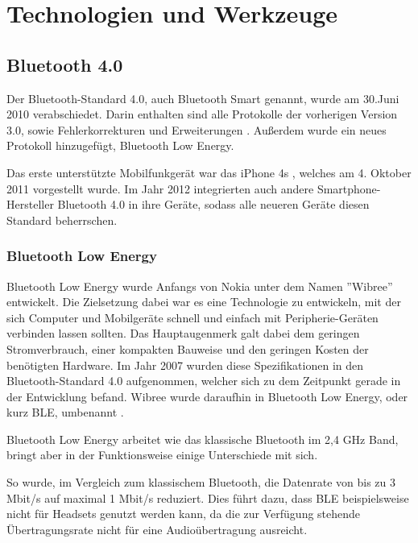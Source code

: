 \chapter{Technologien und Werkzeuge}
\label{chap:technologies}

\section{Bluetooth 4.0}
\label{sec:technologies:bluetooth4}

Der Bluetooth-Standard 4.0, auch Bluetooth Smart genannt, wurde am 30.Juni 2010 verabschiedet. Darin enthalten sind alle Protokolle der vorherigen Version 3.0, sowie Fehlerkorrekturen und Erweiterungen \cite{bluetoothcore}. Außerdem wurde ein neues Protokoll hinzugefügt, Bluetooth Low Energy. 

Das erste unterstützte Mobilfunkgerät war das iPhone 4s \cite{iphone4sspecs}, welches am 4. Oktober 2011 vorgestellt wurde. Im Jahr 2012 integrierten auch andere Smartphone-Hersteller Bluetooth 4.0 in ihre Geräte, sodass alle neueren Geräte diesen Standard beherrschen.


\subsection{Bluetooth Low Energy}
\label{sec:technologies:bluetoothLE}

Bluetooth Low Energy wurde Anfangs von Nokia unter dem Namen ''Wibree'' entwickelt. Die Zielsetzung dabei war es eine Technologie zu entwickeln, mit der sich Computer und Mobilgeräte schnell und einfach mit Peripherie-Geräten verbinden lassen sollten. Das Hauptaugenmerk galt dabei dem geringen Stromverbrauch, einer kompakten Bauweise und den geringen Kosten der benötigten Hardware.
Im Jahr 2007 wurden diese Spezifikationen in den Bluetooth-Standard 4.0 aufgenommen, welcher sich zu dem Zeitpunkt gerade in der Entwicklung befand. Wibree wurde daraufhin in Bluetooth Low Energy, oder kurz BLE, umbenannt \cite{wibree}.

Bluetooth Low Energy arbeitet wie das klassische Bluetooth im 2,4 GHz Band, bringt aber in der Funktionsweise einige Unterschiede mit sich.

So wurde, im Vergleich zum klassischem Bluetooth, die Datenrate von bis zu 3 Mbit/s auf maximal 1 Mbit/s reduziert. Dies führt dazu, dass BLE beispielsweise nicht für Headsets genutzt werden kann, da die zur Verfügung stehende Übertragungsrate nicht für eine Audioübertragung ausreicht.

